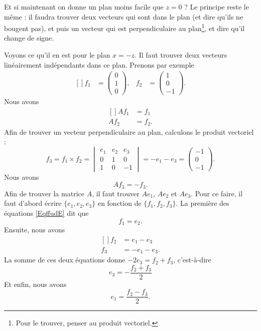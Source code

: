 Et si maintenant on donne un plan moins facile que $z=0$ ? Le principe reste le même : il faudra trouver deux vecteurs qui sont dans le plan (et dire qu'ils ne bougent pas), et puis un vecteur qui est perpendiculaire au plan\footnote{Pour le trouver, penser au produit vectoriel.}, et dire qu'il change de signe.

Voyons ce qu'il en est pour le plan $x=-z$. Il faut trouver deux vecteurs linéairement indépendants dans ce plan. Prenons par exemple
\begin{equation}		\label{EqffudE}
	\begin{aligned}[]
		f_1&=\begin{pmatrix}
			0	\\
			1	\\
			0
		\end{pmatrix},&f_2&=\begin{pmatrix}
			1	\\
			0	\\
			-1
		\end{pmatrix}.
	\end{aligned}
\end{equation}
Nous avons
\begin{equation}
	\begin{aligned}[]
		Af_1&=f_1\\
		Af_2&=f_2.
	\end{aligned}
\end{equation}
Afin de trouver un vecteur perpendiculaire au plan, calculons le produit vectoriel :
\begin{equation}
	f_3=f_1\times f_2=\begin{vmatrix}
		e_1	&	e_2	&	e_3	\\
		0	&	1	&	0	\\
		1	&	0	&	-1
	\end{vmatrix}=-e_1-e_3=\begin{pmatrix}
		-1	\\
		0	\\
		-1
	\end{pmatrix}.
\end{equation}
Nous avons
\begin{equation}
	Af_3=-f_3.
\end{equation}
Afin de trouver la matrice $A$, il faut trouver $Ae_1$, $Ae_2$ et $Ae_3$. Pour ce faire, il faut d'abord écrire $\{ e_1,e_2,e_3 \}$ en fonction de $\{ f_1,f_2,f_3 \}$. La première des équations \eqref{EqffudE} dit que
\begin{equation}
	f_1=e_2.
\end{equation}
Ensuite, nous avons
\begin{equation}
	\begin{aligned}[]
		f_2&=e_1-e_3\\
		f_3&=-e_1-e_3.
	\end{aligned}
\end{equation}
La somme de ces deux équations donne $-2e_3=f_2+f_3$, c'est-à-dire
\begin{equation}
	e_3=-\frac{ f_2+f_3 }{ 2 }
\end{equation}
Et enfin, nous avons
\begin{equation}
	e_1=\frac{ f_2-f_3 }{ 2 }.
\end{equation}

